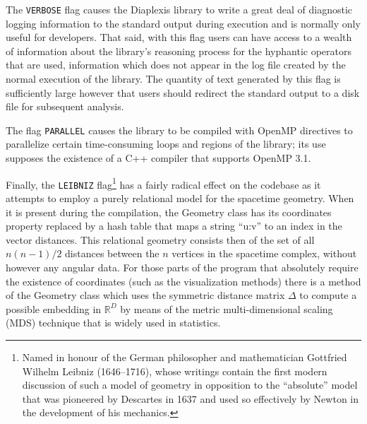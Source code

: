 \documentclass[12pt,letterpaper]{report}
\begin{document}
The \texttt{VERBOSE} flag causes the Diaplexis library to write a great deal of 
diagnostic logging information to the standard output during execution and is normally 
only useful for developers. That said, with this flag users can have access to a 
wealth of information about the library's reasoning process for the hyphantic operators 
that are used, information which does not appear in the log file created by the normal 
execution of the library. The quantity of text generated by this flag is sufficiently 
large however that users should redirect the standard output to a disk file for subsequent 
analysis. 

The flag \texttt{PARALLEL} causes the library to be compiled with OpenMP directives to 
parallelize certain time-consuming loops and regions of the library; its use supposes the 
existence of a C++ compiler that supports OpenMP 3.1. 

Finally, the \texttt{LEIBNIZ} flag\footnote{Named in honour of the German philosopher and 
mathematician Gottfried Wilhelm Leibniz (1646--1716), whose writings contain the first 
modern discussion of such a model of geometry in opposition to the ``absolute'' model that 
was pioneered by Descartes in 1637 and used so effectively by Newton in the development of 
his mechanics.} has a fairly radical effect on the codebase as it attempts to employ a purely 
relational model for the spacetime geometry. When it is present during the compilation, the 
Geometry class has its coordinates property replaced by a hash table that maps a string 
``u:v'' to an index in the vector distances. This relational geometry consists then of the 
set of all $n(n-1)/2$ distances between the $n$ vertices in the spacetime complex, without 
however any angular data. For those parts of the program that absolutely require the 
existence of coordinates (such as the visualization methods) there is a method of the Geometry 
class which uses the symmetric distance matrix $\Delta$ to compute a possible embedding in 
$\mathbb{R}^D$ by means of the metric multi-dimensional scaling (MDS) technique that is widely 
used in statistics.   
\end{document}
